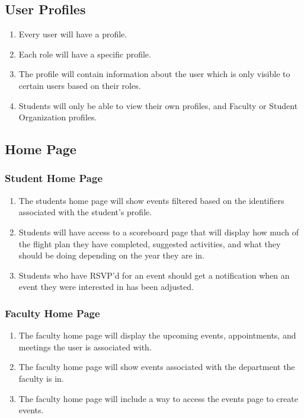 	\subsection{User Profiles}
		\begin{enumerate}[leftmargin=3\parindent]
			\item Every user will have a profile.
			\item Each role will have a specific profile.
			\item The profile will contain information about the user which is only visible to certain users based on their roles.
			\item Students will only be able to view their own profiles, and Faculty or Student Organization profiles.
		\end{enumerate}

\newpage %
\subsection{Home Page}
		\subsubsection{Student Home Page}
			\begin{enumerate}[leftmargin=3\parindent]
				\item The students home page will show events filtered based on the identifiers associated with the student’s profile.
				\item Students will have access to a scoreboard page that will display how much of the flight plan they have completed, suggested activities, and what they should be doing depending on the year they are in.
				\item Students who have RSVP’d for an event should get a notification when an event they were interested in has been adjusted.
			\end{enumerate}
		\subsubsection{Faculty Home Page}
			\begin{enumerate}[leftmargin=3\parindent]
				\item The faculty home page will display the upcoming events, appointments, and meetings the user is associated with.
				\item The faculty home page will show events associated with the department the faculty is in.
				\item The faculty home page will include a way to access the events page to create events.
			\end{enumerate}
